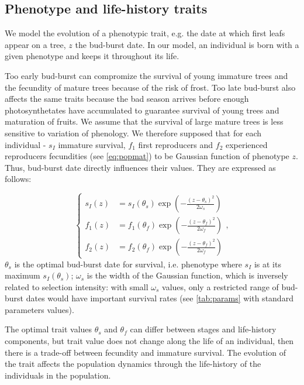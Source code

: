 \subsection*{Phenotype and life-history traits}

We model the evolution of a phenotypic trait, e.g. the date at which first leafs appear on a tree, $z$ the bud-burst date. In our model, an individual is born with a given phenotype and keeps it throughout its life.

Too early bud-burst can compromize the survival of young immature trees and the fecundity of mature trees because of the risk of frost. Too late bud-burst also affects the same traits because the bad season arrives before enough photosynthetates have accumulated to guarantee survival of young trees and maturation of fruits. We assume that the survival of large mature trees is less sensitive to variation of phenology. We therefore supposed that for each individual - $s_{I}$ immature survival, $f_1$ first reproducers and $f_2$ experienced reproducers fecundities (see \autoref{eq:popmat}) to be Gaussian function of phenotype $z$. Thus, bud-burst date directly influences their values. They are expressed as follows:

\begin{equation}
	\label{eq:indlht}
	\left\{
	\begin{aligned}
	s_{I}(z) &= s_{I}(\theta_{s})	\exp\left(-\frac{(z - \theta_{s})^2}{2\omega_{s}}\right) \\
	f_1(z) &= f_1(\theta_{f})	\exp\left(-\frac{(z - \theta_{f})^2}{2\omega_{f}}\right) \\
	f_2(z) &= f_2(\theta_{f})	\exp\left(-\frac{(z - \theta_{f})^2}{2\omega_{f}}\right)
	\end{aligned}
	\right.,
\end{equation}
$\theta_s$ is the optimal bud-burst date for survival, i.e. phenotype where $s_I$ is at its maximum $s_I(\theta_s)$; $\omega_s$ is the width of the Gaussian function, which is inversely related to selection intensity: with small $\omega_s$ values, only a restricted range of bud-burst dates would have important survival rates (see \autoref{tab:params} with standard parameters values).

The optimal trait values $\theta_s$ and $\theta_f$ can differ between stages and life-history components, but trait value does not change along the life of an individual, then there is a trade-off between fecundity and immature survival. The evolution of the trait affects the population dynamics through the life-history of the individuals in the population.

